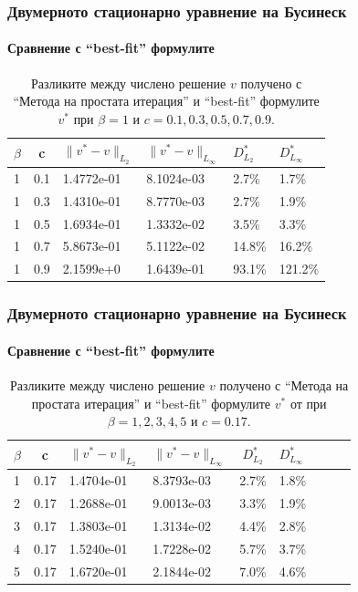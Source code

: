 \documentclass{beamer}
\begin{document}
\begin{frame}
\frametitle{Двумерното стационарно уравнение на Бусинеск}
\framesubtitle{Сравнение с ``best-fit'' формулите}
\begin{table}[ht]
\centering
\begin{tabular}{|l|c|l l|l l|}
\hline 
\hline 
$\beta$	& c 	& $\|v^*-v \|_{L_2 }$ & $\|v^*-v \|_{L_\infty }$  	& $D^*_{L_2}$	& $D^*_{L_\infty }$	\\
\hline 
1& 		0.1	&	1.4772e-01 		& 	8.1024e-03 				& 2.7\%			& 1.7\%		\\
\hline 
1& 		0.3 	&	1.4310e-01 		& 	8.7770e-03				& 2.7\%			& 1.9\%		\\
\hline 
1& 		0.5 	&	1.6934e-01 		& 	1.3332e-02				& 3.5\%			& 3.3\%		\\
\hline 
1& 		0.7 	&	5.8673e-01		& 	5.1122e-02				& 14.8\%		& 16.2\%	\\
\hline 
1& 		0.9	&	2.1599e+0 		& 	1.6439e-01				& 93.1\%		& 121.2\%	\\
\hline 
\hline 
\end{tabular}
\caption{Разликите между числено решение $v$ получено с ``Метода на простата итерация'' и ``best-fit'' формулите $v^*$ при $\beta=1$ и $c=0.1, 0.3, 0.5, 0.7, 0.9$.}
\label{tab:diff-beta1}
\end{table}

\end{frame}

\begin{frame}
\frametitle{Двумерното стационарно уравнение на Бусинеск}
\framesubtitle{Сравнение с ``best-fit'' формулите}
\begin{table}
\centering
\begin{tabular}{|l|c|l l| c|l|c|l l|}
\hline 
\hline 
$\beta$	& c 	& $\|v^*-v \|_{L_2 }$ & $\|v^*-v \|_{L_\infty }$  	& $D^*_{L_2}$	& $D^*_{L_\infty }$	\\
\hline 
1& 		0.17&	1.4704e-01 		& 	8.3793e-03 				& 2.7\%			& 1.8\%		\\
\hline 
2& 		0.17&	1.2688e-01 		& 	9.0013e-03				& 3.3\%			& 1.9\%		\\
\hline 
3& 		0.17&	1.3803e-01 		& 	1.3134e-02				& 4.4\%			& 2.8\%		\\
\hline 
4& 		0.17&	 1.5240e-01 		& 	1.7228e-02				& 5.7\%			& 3.7\%		\\
\hline 
5& 		0.17&	1.6720e-01 		& 	2.1844e-02				& 7.0\%			& 4.6\%		\\
\hline 
\hline 
\end{tabular}
\caption{Разликите между числено решение $v$ получено с ``Метода на простата итерация'' и ``best-fit'' формулите $v^*$ от \cite{Ch2011} при $\beta=1, 2, 3, 4, 5$ и $c=0.17$.}
\label{tab:diff-c017}
\end{table}
\end{frame}
\end{document}

